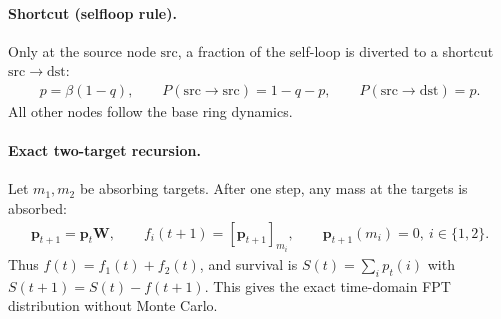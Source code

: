 \documentclass[11pt]{article}
\begin{document}
\paragraph{Shortcut (selfloop rule).}
Only at the source node $\mathrm{src}$, a fraction of the self-loop is diverted to a shortcut $\mathrm{src}\to\mathrm{dst}$:
\begin{align}
  p=\beta(1-q),\qquad P(\mathrm{src}\to\mathrm{src})=1-q-p,\qquad P(\mathrm{src}\to\mathrm{dst})=p.
\end{align}
All other nodes follow the base ring dynamics.

\paragraph{Exact two-target recursion.}
Let $m_1,m_2$ be absorbing targets. After one step, any mass at the targets is absorbed:
\begin{align}
  \mathbf{p}_{t+1}=\mathbf{p}_t\mathbf{W},\qquad
  f_i(t+1)=[\mathbf{p}_{t+1}]_{m_i},\qquad
  \mathbf{p}_{t+1}(m_i)=0,\ i\in\{1,2\}.
\end{align}
Thus $f(t)=f_1(t)+f_2(t)$, and survival is $S(t)=\sum_i p_t(i)$ with $S(t+1)=S(t)-f(t+1)$.
This gives the exact time-domain FPT distribution without Monte Carlo.
\end{document}
